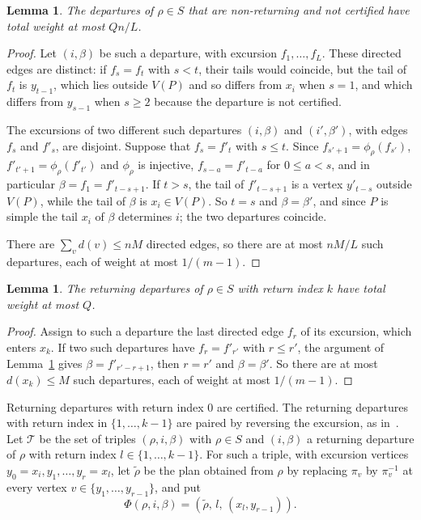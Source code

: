 \documentclass[11pt]{amsart}
\newtheorem{lemma}[theorem]{Lemma}
\theoremstyle{remark}
\begin{document}
\begin{lemma}\label{lem:nonreturning}
The departures of $\rho\in S$ that are non-returning and not certified have total weight at most $Qn/L$.
\end{lemma}

\begin{proof}
Let $(i,\beta)$ be such a departure, with excursion $f_1,\dots,f_L$. These directed edges are distinct: if $f_s=f_t$
with $s<t$, their tails would coincide, but the tail of $f_t$ is $y_{t-1}$, which lies outside $V(P)$ and so differs
from $x_i$ when $s=1$, and which differs from $y_{s-1}$ when $s\ge2$ because the departure is not certified.

The excursions of two different such departures $(i,\beta)$ and $(i',\beta')$, with edges $f_s$ and $f'_s$, are
disjoint. Suppose that $f_s=f'_t$ with $s\le t$. Since $f_{s'+1}=\phi_\rho(f_{s'})$, $f'_{t'+1}=\phi_\rho(f'_{t'})$ and
$\phi_\rho$ is injective, $f_{s-a}=f'_{t-a}$ for $0\le a<s$, and in particular $\beta=f_1=f'_{t-s+1}$. If $t>s$, the tail
of $f'_{t-s+1}$ is a vertex $y'_{t-s}$ outside $V(P)$, while the tail of $\beta$ is $x_i\in V(P)$. So $t=s$ and
$\beta=\beta'$, and since $P$ is simple the tail $x_i$ of $\beta$ determines $i$; the two departures coincide.

There are $\sum_v d(v)\le nM$ directed edges, so there are at most $nM/L$ such departures, each of weight at most
$1/(m-1)$.
\end{proof}

\begin{lemma}\label{lem:terminal}
The returning departures of $\rho\in S$ with return index $k$ have total weight at most $Q$.
\end{lemma}

\begin{proof}
Assign to such a departure the last directed edge $f_r$ of its excursion, which enters $x_k$. If two such departures
have $f_r=f'_{r'}$ with $r\le r'$, the argument of Lemma~\ref{lem:nonreturning} gives $\beta=f'_{r'-r+1}$, then
$r=r'$ and $\beta=\beta'$. So there are at most $d(x_k)\le M$ such departures, each of weight at most $1/(m-1)$.
\end{proof}

Returning departures with return index $0$ are certified. The returning departures with return index in
$\{1,\dots,k-1\}$ are paired by reversing the excursion, as in~\cite{Doz26}. Let $\mathcal T$ be the set of triples
$(\rho,i,\beta)$ with $\rho\in S$ and $(i,\beta)$ a returning departure of $\rho$ with return index
$l\in\{1,\dots,k-1\}$. For such a triple, with excursion vertices $y_0=x_i,y_1,\dots,y_r=x_l$, let $\tilde\rho$ be
the plan obtained from $\rho$ by replacing $\pi_v$ by $\pi_v^{-1}$ at every vertex $v\in\{y_1,\dots,y_{r-1}\}$, and
put
\[
\Phi(\rho,i,\beta)=(\tilde\rho,\,l,\,(x_l,y_{r-1})).
\]
\end{document}
